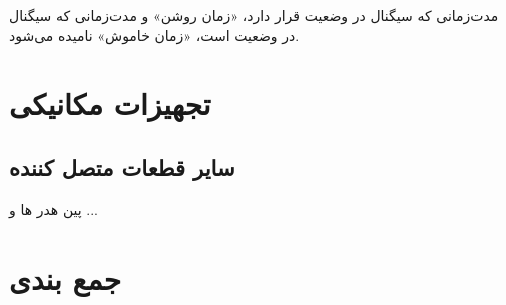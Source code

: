 مدت‌زمانی که سیگنال در وضعیت  قرار دارد، «زمان روشن» و مدت‌زمانی که سیگنال در وضعیت  است، «زمان خاموش»  نامیده می‌شود.

\section{تجهیزات مکانیکی}

\subsection{سایر قطعات متصل کننده}
پین هدر ها و ...

\section{جمع بندی}


